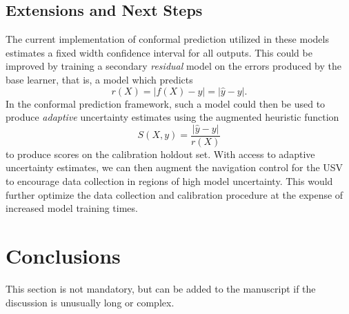 \documentclass[journal,article,submit,pdftex,moreauthors]{Definitions/mdpi}
\begin{document}
\subsection{Extensions and Next Steps}

The current implementation of conformal prediction utilized in these models estimates a fixed width confidence interval for all outputs. This could be improved by training a secondary \textit{residual} model on the errors produced by the base learner, that is, a model which predicts 
\begin{equation}
    r(X) = \lvert f(X) - y \rvert = \lvert \hat{y} - y \rvert.
\end{equation}
In the conformal prediction framework, such a model could then be used to produce \textit{adaptive} uncertainty estimates using the augmented heuristic function
\begin{equation}
    S(X,y)  = \dfrac{\lvert \hat{y} - y \rvert }{r(X)}
\end{equation}
to produce scores on the calibration holdout set. With access to adaptive uncertainty estimates, we can then augment the navigation control for the USV to encourage data collection in regions of high model uncertainty. This would further optimize the data collection and calibration procedure at the expense of increased model training times. 



\section{Conclusions}

This section is not mandatory, but can be added to the manuscript if the discussion is unusually long or complex.


\vspace{6pt} 


\end{document}
